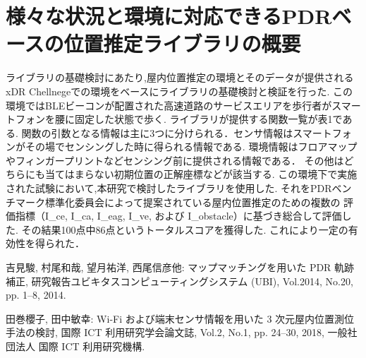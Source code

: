 \documentclass[Japanese]{abstruct}
\begin{document}
\section{様々な状況と環境に対応できるPDRベースの位置推定ライブラリの概要}
ライブラリの基礎検討にあたり,屋内位置推定の環境とそのデータが提供されるxDR Chellnegeでの環境をベースにライブラリの基礎検討と検証を行った.
この環境ではBLEビーコンが配置された高速道路のサービスエリアを歩行者がスマートフォンを腰に固定した状態で歩く.
ライブラリが提供する関数一覧が表1である.
関数の引数となる情報は主に3つに分けられる．センサ情報はスマートフォンがその場でセンシングした時に得られる情報である.
環境情報はフロアマップやフィンガープリントなどセンシング前に提供される情報である．
その他はどちらにも当てはまらない初期位置の正解座標などが該当する.
この環境下で実施された試験において,本研究で検討したライブラリを使用した.
それをPDRベンチマーク標準化委員会によって提案されている屋内位置推定のための複数の
評価指標（I\_ce, I\_ca, I\_eag, I\_ve, および I\_obstacle）に基づき総合して評価した.
その結果100点中86点というトータルスコアを獲得した.
これにより一定の有効性を得られた．

\begin{thebibliography}{2}
	吉見駿, 村尾和哉, 望月祐洋, 西尾信彦他:
	マップマッチングを用いた PDR 軌跡補正,
	研究報告ユビキタスコンピューティングシステム (UBI),
	Vol.2014, No.20, pp. 1--8, 2014.

	田巻櫻子, 田中敏幸:
	Wi-Fi および端末センサ情報を用いた 3 次元屋内位置測位手法の検討,
	国際 ICT 利用研究学会論文誌,
	Vol.2, No.1, pp. 24--30, 2018,
	一般社団法人 国際 ICT 利用研究機構.
\end{thebibliography}
\end{document}
